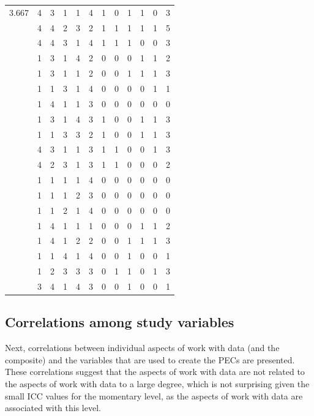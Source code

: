 \documentclass[]{msu-thesis}
\theoremstyle{definition}
\theoremstyle{definition}
\theoremstyle{definition}
\theoremstyle{remark}
\begin{document}
\begin{table}
{\begin{tabular}[t]{rrrrrrrrrrrr}
3.667 & 4 & 3 & 1 & 1 & 4 & 1 & 0 & 1 & 1 & 0 & 3\\
 & 4 & 4 & 2 & 3 & 2 & 1 & 1 & 1 & 1 & 1 & 5\\
 & 4 & 4 & 3 & 1 & 4 & 1 & 1 & 1 & 0 & 0 & 3\\
 & 1 & 3 & 1 & 4 & 2 & 0 & 0 & 0 & 1 & 1 & 2\\
 & 1 & 3 & 1 & 1 & 2 & 0 & 0 & 1 & 1 & 1 & 3\\
 & 1 & 1 & 3 & 1 & 4 & 0 & 0 & 0 & 0 & 1 & 1\\
 & 1 & 4 & 1 & 1 & 3 & 0 & 0 & 0 & 0 & 0 & 0\\
 & 1 & 3 & 1 & 4 & 3 & 1 & 0 & 0 & 1 & 1 & 3\\
 & 1 & 1 & 3 & 3 & 2 & 1 & 0 & 0 & 1 & 1 & 3\\
 & 4 & 3 & 1 & 1 & 3 & 1 & 1 & 0 & 0 & 1 & 3\\
 & 4 & 2 & 3 & 1 & 3 & 1 & 1 & 0 & 0 & 0 & 2\\
 & 1 & 1 & 1 & 1 & 4 & 0 & 0 & 0 & 0 & 0 & 0\\
 & 1 & 1 & 1 & 2 & 3 & 0 & 0 & 0 & 0 & 0 & 0\\
 & 1 & 1 & 2 & 1 & 4 & 0 & 0 & 0 & 0 & 0 & 0\\
 & 1 & 4 & 1 & 1 & 1 & 0 & 0 & 0 & 1 & 1 & 2\\
 & 1 & 4 & 1 & 2 & 2 & 0 & 0 & 1 & 1 & 1 & 3\\
 & 1 & 1 & 4 & 1 & 4 & 0 & 0 & 1 & 0 & 0 & 1\\
 & 1 & 2 & 3 & 3 & 3 & 0 & 1 & 1 & 0 & 1 & 3\\
 & 3 & 4 & 1 & 4 & 3 & 0 & 0 & 1 & 0 & 0 & 1\\
\bottomrule
\end{tabular}}
\end{table}

\subsection{Correlations among study
variables}\label{correlations-among-study-variables}

Next, correlations between individual aspects of work with data (and the
composite) and the variables that are used to create the PECs are
presented. These correlations suggest that the aspects of work with data
are not related to the aspects of work with data to a large degree,
which is not surprising given the small ICC values for the momentary
level, as the aspects of work with data are associated with this level.
\end{document}
